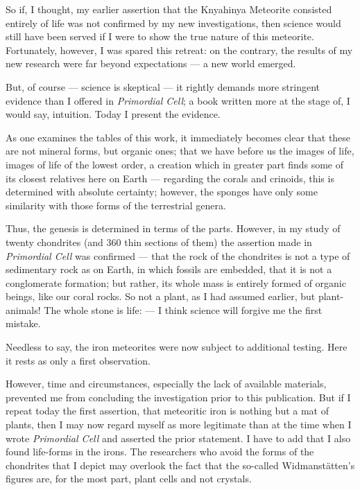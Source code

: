 \documentclass[a4paper, 12pt, oneside]{article}
\begin{document}
So if, I thought, my earlier assertion that the Knyahinya Meteorite consisted entirely of life was not confirmed by my new investigations, then science would still have been served if I were to show the true nature of this meteorite. Fortunately, however, I was spared this retreat: on the contrary, the results of my new research were far beyond expectations — a new world emerged.

But, of course — science is skeptical — it rightly demands more stringent evidence than I offered in \emph{Primordial Cell}; a book written more at the stage of, I would say, intuition. Today I present the evidence.

As one examines the tables of this work, it immediately becomes clear that these are not mineral forms, but organic ones; that we have before us the images of life, images of life of the lowest order, a creation which in greater part finds some of its closest relatives here on Earth — regarding the corals and crinoids, this is determined with absolute certainty; however, the sponges have only some similarity with those forms of the terrestrial genera.

Thus, the genesis is determined in terms of the parts. However, in my study of twenty chondrites (and 360 thin sections of them) the assertion made in \emph{Primordial Cell} was confirmed — that the rock of the chondrites is not a type of sedimentary rock as on Earth, in which fossils are embedded, that it is not a conglomerate formation; but rather, its whole mass is entirely formed of organic beings, like our coral rocks. So not a plant, as I had assumed earlier, but plant-animals! The whole stone is life: — I think science will forgive me the first mistake.

Needless to say, the iron meteorites were now subject to additional testing. Here it rests as only a first observation.

However, time and circumstances, especially the lack of available materials, prevented me from concluding the investigation prior to this publication. But if I repeat today the first assertion, that meteoritic iron is nothing but a mat of plants, then I may now regard myself as more legitimate than at the time when I wrote \emph{Primordial Cell} and asserted the prior statement. I have to add that I also found life-forms in the irons. The researchers who avoid the forms of the chondrites that I depict may overlook the fact that the so-called Widmanstätten's figures are, for the most part, plant cells and not crystals.
\end{document}

